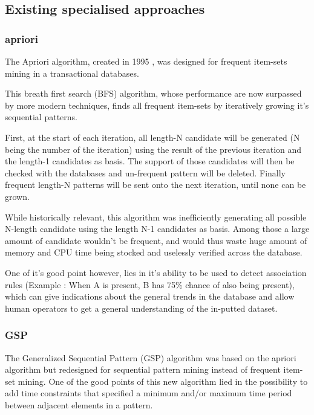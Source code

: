 \documentclass{eplmastersthesis}
\begin{document}
\subsection{Existing specialised approaches}

\subsubsection{apriori}

The Apriori algorithm, created in 1995 \cite{agrawal1995mining}, was designed for frequent item-sets mining in a transactional databases.\newline

This breath first search (BFS) algorithm, whose performance are now surpassed by more modern techniques, finds all frequent item-sets by iteratively growing it's sequential patterns. \newline

First, at the start of each iteration, all length-N candidate will be generated (N being the number of the iteration) using the result of the previous iteration and the length-1 candidates as basis. The support of those candidates will then be checked with the databases and un-frequent pattern will be deleted. Finally frequent length-N patterns will be sent onto the next iteration, until none can be grown. \newline

While historically relevant, this algorithm was inefficiently generating all possible N-length candidate using the length N-1 candidates as basis. Among those a large amount of candidate wouldn't be frequent, and would thus waste huge amount of memory and CPU time being stocked and uselessly verified across the database. \newline

One of it's good point however, lies in it's ability to be used to detect association rules (Example : When A is present, B has 75\% chance of also being present), which can give indications about the general trends in the database and allow human operators to get a general understanding of the in-putted dataset.

\subsubsection{GSP}

The Generalized Sequential Pattern (GSP) algorithm \cite{srikant1996mining} was based on the apriori algorithm but redesigned for sequential pattern mining instead of frequent item-set mining. One of the good points of this new algorithm lied in the possibility to add time constraints that specified a minimum and/or maximum time period between adjacent elements in a pattern. \newline
\end{document}
